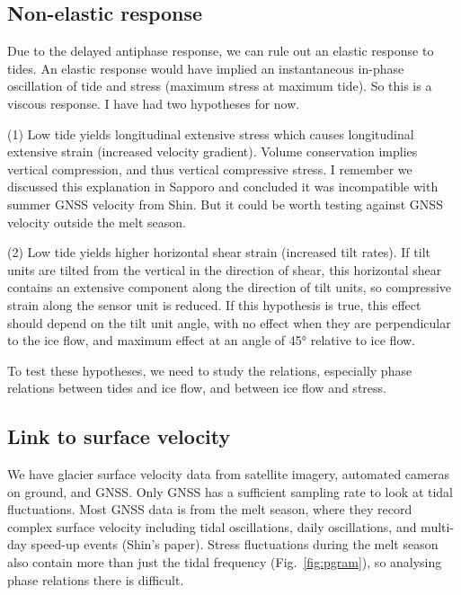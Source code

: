 \documentclass[utf8]{article}
\begin{document}
\subsection{Non-elastic response}

    Due to the delayed antiphase response, we can rule out an elastic response
    to tides. An elastic response would have implied an instantaneous in-phase
    oscillation of tide and stress (maximum stress at maximum tide). So this
    is a viscous response. I have had two hypotheses for now.

    (1) Low tide yields longitudinal extensive stress which causes longitudinal
    extensive strain (increased velocity gradient). Volume conservation implies
    vertical compression, and thus vertical compressive stress. I remember we
    discussed this explanation in Sapporo and concluded it was incompatible
    with summer GNSS velocity from Shin. But it could be worth testing against
    GNSS velocity outside the melt season.

    (2) Low tide yields higher horizontal shear strain (increased tilt rates).
    If tilt units are tilted from the vertical in the direction of shear, this
    horizontal shear contains an extensive component along the direction of
    tilt units, so compressive strain along the sensor unit is reduced. If this
    hypothesis is true, this effect should depend on the tilt unit angle, with
    no effect when they are perpendicular to the ice flow, and maximum effect
    at an angle of 45° relative to ice flow.

    To test these hypotheses, we need to study the relations, especially phase
    relations between tides and ice flow, and between ice flow and stress.

\subsection{Link to surface velocity}

    We have glacier surface velocity data from satellite imagery, automated
    cameras on ground, and GNSS. Only GNSS has a sufficient sampling rate to
    look at tidal fluctuations. Most GNSS data is from the melt season, where
    they record complex surface velocity including tidal oscillations, daily
    oscillations, and multi-day speed-up events (Shin's paper). Stress
    fluctuations during the melt season also contain more than just the tidal
    frequency (Fig.~\ref{fig:pgram}), so analysing phase relations there is
    difficult.
\end{document}

